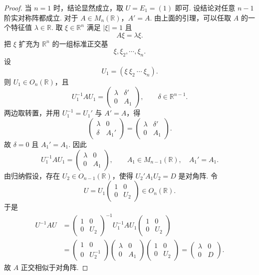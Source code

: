 \begin{proof}
	当 $n=1$ 时，结论显然成立，取 $U=E_1=(1)$ 即可. 设结论对任意 $n-1$ 阶实对称阵都成立. 对于 $A\in M_n(\mathbb{R})$，$A'=A$. 由上面的引理，可以任取 $A$ 的一个特征值 $\lambda\in\mathbb{R}$. 取 $\xi\in\mathbb{R}^n$ 满足 $|\xi|=1$ 且
	\[
	A\xi=\lambda\xi.
	\]
	把 $\xi$ 扩充为 $\mathbb{R}^n$ 的一组标准正交基
	\[
	\xi,\xi_2,\cdots,\xi_n.
	\]
	设
	\[
	U_1=(\xi\ \xi_2\ \cdots\ \xi_n).
	\]
	则 $U_1\in O_n(\mathbb{R})$，且
	\[
	U_1^{-1}AU_1=\begin{pmatrix}
		\lambda&\delta'\\
		0&A_1
	\end{pmatrix},
	\qquad \delta\in\mathbb{R}^{n-1}.
	\]
	两边取转置，并用 $U_1^{-1}=U_1'$ 与 $A'=A$，得
	\[
	\begin{pmatrix}
		\lambda&0\\
		\delta&A_1'
	\end{pmatrix}
	=\begin{pmatrix}
		\lambda&\delta'\\
		0&A_1
	\end{pmatrix}.
	\]
	故 $\delta=0$ 且 $A_1'=A_1$. 因此
	\[
	U_1^{-1}AU_1=\begin{pmatrix}
		\lambda&0\\
		0&A_1
	\end{pmatrix},
	\qquad A_1\in M_{n-1}(\mathbb{R}),\quad A_1'=A_1.
	\]
	由归纳假设，存在 $U_2\in O_{n-1}(\mathbb{R})$，使得 $U_2'A_1U_2=D$ 是对角阵. 令
	\[
	U=U_1\begin{pmatrix}
		1&0\\
		0&U_2
	\end{pmatrix}\in O_n(\mathbb{R}).
	\]
	于是
	\[
	\begin{aligned}
		U^{-1}AU
		&=\begin{pmatrix}1&0\\0&U_2\end{pmatrix}^{-1}
		U_1^{-1}AU_1
		\begin{pmatrix}1&0\\0&U_2\end{pmatrix}\\
		&=\begin{pmatrix}1&0\\0&U_2^{-1}\end{pmatrix}
		\begin{pmatrix}\lambda&0\\0&A_1\end{pmatrix}
		\begin{pmatrix}1&0\\0&U_2\end{pmatrix}
		=\begin{pmatrix}\lambda&0\\0&D\end{pmatrix}.
	\end{aligned}
	\]
	故 $A$ 正交相似于对角阵.
\end{proof}

